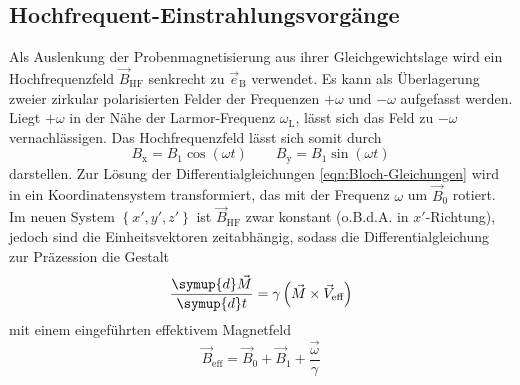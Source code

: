 \subsection{Hochfrequent-Einstrahlungsvorgänge}
\label{sec:HF-Einstrahlung}

Als Auslenkung der Probenmagnetisierung aus ihrer Gleichgewichtslage wird
ein Hochfrequenzfeld $\vec{B}_\text{HF}$ senkrecht zu $\vec{e}_\text{B}$ verwendet.
Es kann als Überlagerung zweier zirkular polarisierten Felder der
Frequenzen $+\omega$ und $-\omega$ aufgefasst werden.
Liegt $+\omega$ in der Nähe der Larmor-Frequenz $\omega_\text{L}$,
lässt sich das Feld zu $-\omega$ vernachlässigen.
Das Hochfrequenzfeld lässt sich somit durch
\begin{equation*}
  B_\text{x} = B_1 \cos\!\left(\omega t\right) \quad\quad
  B_\text{y} = B_1 \sin\!\left(\omega t\right)
\end{equation*}
darstellen.
Zur Lösung der Differentialgleichungen \eqref{eqn:Bloch-Gleichungen} wird in ein
Koordinatensystem transformiert, das mit der Frequenz $\omega$ um $\vec{B}_0$
rotiert. Im neuen System $\left\{x', y', z'\right\}$
ist $\vec{B}_\text{HF}$ zwar konstant (o.B.d.A. in $x'$-Richtung),
jedoch sind die Einheitsvektoren zeitabhängig,
sodass die Differentialgleichung zur Präzession die Gestalt
\begin{equation*}
  \frac{\symup{d} \vec{M}}{\symup{d} t} =
  \gamma \left(\vec{M} \times \vec{V}_\text{eff}\right)
\end{equation*}
mit einem eingeführten effektivem Magnetfeld
\begin{equation*}
  \vec{B}_\text{eff} = \vec{B}_0 + \vec{B}_1 + \frac{\vec{\omega}}{\gamma}
\end{equation*}
